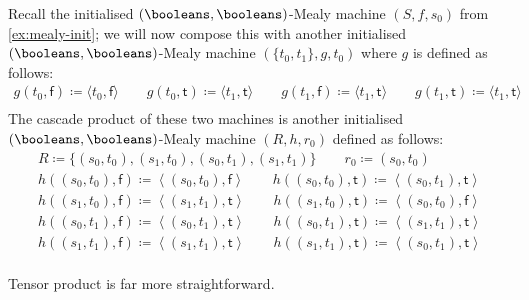 \begin{example}\label{ex:mealy-cascade}
    Recall the initialised \((\booleans,\booleans)\)-Mealy machine
    \((S, f, s_0)\) from \cref{ex:mealy-init}; we will now compose this with
    another initialised \((\booleans,\booleans)\)-Mealy machine
    \((\{t_0,t_1\},g,t_0)\) where \(g\) is defined as follows:
    \begin{gather*}
        g(t_0, \mathsf{f}) \coloneqq \langle{t_0,\mathsf{f}}\rangle
        \qquad
        g(t_0, \mathsf{t}) \coloneqq \langle{t_1,\mathsf{t}}\rangle
        \qquad
        g(t_1, \mathsf{f}) \coloneqq \langle{t_1,\mathsf{t}}\rangle
        \qquad
        g(t_1, \mathsf{t}) \coloneqq \langle{t_1,\mathsf{t}}\rangle
        \\
        
    \end{gather*}
    The cascade product of these two machines is another initialised
    \((\booleans,\booleans)\)-Mealy machine \((R,h,r_0)\) defined as follows:
    \begin{gather*}
        R \coloneqq \{(s_0,t_0), (s_1,t_0), (s_0,t_1), (s_1,t_1)\}
        \qquad
        r_0 \coloneqq (s_0,t_0)
        \\
        h((s_0, t_0), \mathsf{f})
        \coloneqq
        \left\langle(s_0, t_0), \mathsf{f}\right\rangle
        \qquad
        h((s_0, t_0), \mathsf{t})
        \coloneqq
        \left\langle(s_0, t_1), \mathsf{t}\right\rangle
        \\
        h((s_1, t_0), \mathsf{f})
        \coloneqq
        \left\langle(s_1, t_1), \mathsf{t}\right\rangle
        \qquad
        h((s_1, t_0), \mathsf{t})
        \coloneqq
        \left\langle(s_0, t_0), \mathsf{f}\right\rangle
        \\
        h((s_0, t_1), \mathsf{f})
        \coloneqq
        \left\langle(s_0, t_1), \mathsf{t}\right\rangle
        \qquad
        h((s_0, t_1), \mathsf{t})
        \coloneqq
        \left\langle(s_1, t_1), \mathsf{t}\right\rangle
        \\
        h((s_1, t_1), \mathsf{f})
        \coloneqq
        \left\langle(s_1, t_1), \mathsf{t}\right\rangle
        \qquad
        h((s_1, t_1), \mathsf{t})
        \coloneqq
        \left\langle(s_0, t_1), \mathsf{t}\right\rangle
        \\
        
    \end{gather*}
\end{example}

Tensor product is far more straightforward.

